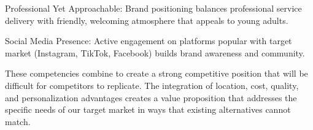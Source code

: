 Professional Yet Approachable: Brand positioning balances professional service delivery with friendly, welcoming atmosphere that appeals to young adults.

Social Media Presence: Active engagement on platforms popular with target market (Instagram, TikTok, Facebook) builds brand awareness and community.

These competencies combine to create a strong competitive position that will be difficult for competitors to replicate. The integration of location, cost, quality, and personalization advantages creates a value proposition that addresses the specific needs of our target market in ways that existing alternatives cannot match.

\vspace{1em}

\vspace{1.5em}

